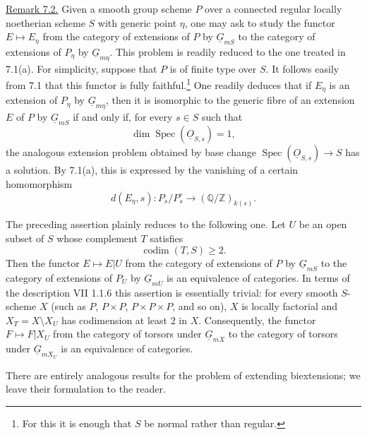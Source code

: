 
\medskip
\noindent\underline{Remark 7.2.}  Given a smooth group scheme $P$ over a
connected regular locally noetherian scheme $S$ with generic point $\eta$,
one may ask to study the functor $E\mapsto E_\eta$ from the category of
extensions of $P$ by $\underline G_{mS}$ to the category of extensions of
$P_\eta$ by $\underline G_{m\eta}$.  This problem is readily reduced to the
one treated in 7.1(a).  For simplicity, suppose that $P$ is of finite type
over $S$.  It follows easily from 7.1 that this functor is fully
faithful.\footnote{For this it is enough that $S$ be normal rather than
regular.}  One readily deduces that if $E_\eta$ is an extension of $P_\eta$
by $\underline G_{m\eta}$, then it is isomorphic to the generic fibre of an
extension $E$ of $P$ by $\underline G_{mS}$ if and only if, for every
$s\in S$ such that
\[
 \dim\operatorname{Spec}(\underline O_{S,s})=1,
\]
the analogous extension problem obtained by base change
$\operatorname{Spec}(\underline O_{S,s})\to S$ has a solution.  By 7.1(a),
this is expressed by the vanishing of a certain homomorphism
\begin{equation}\tag{7.2.1}
 d(E_\eta,s):P_s/P_s^{\circ}
 \longrightarrow(\mathbb Q/\mathbb Z)_{k(s)}.
\end{equation}

The preceding assertion plainly reduces to the following one.  Let $U$ be
an open subset of $S$ whose complement $T$ satisfies
\[
 \operatorname{codim}(T,S)\geq2.
\]
Then the functor $E\mapsto E|U$ from the category of extensions of $P$ by
$\underline G_{mS}$ to the category of extensions of $P_U$ by
$\underline G_{mU}$ is an equivalence of categories.  In terms of the
description VII 1.1.6 this assertion is essentially trivial: for every
smooth $S$-scheme $X$ (such as $P$, $P\times P$,
$P\times P\times P$, and so on), $X$ is locally factorial and
$X_T=X\setminus X_U$ has codimension at least $2$ in $X$.  Consequently,
the functor $F\mapsto F|X_U$ from the category of torsors under
$\underline G_{mX}$ to the category of torsors under
$\underline G_{mX_U}$ is an equivalence of categories.

There are entirely analogous results for the problem of extending
biextensions; we leave their formulation to the reader.

